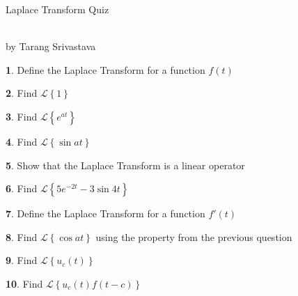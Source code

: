 \documentclass[11pt]{article}
\author{Tarang Srivastava}
\newcommand{\laplace}[1]{$ \mathcal{L}  \left\{ #1 \right\}$}
\newcommand{\heaviside}[1]{u_{#1} (t)}
\newcommand{\makechaptertitle}{
\begin{center}
	\begin{large}
		Laplace Transform Quiz
	\end{large}
	\begin{small}
		\\by Tarang Srivastava
	\end{small}
\end{center}
}
\theoremstyle{definition}
\newtheorem{q}{}
\begin{document}
	\begin{multicols*}{2}
		\makechaptertitle
		
		\begin{q}
			Define the Laplace Transform for a function $ f(t) $
		\end{q}
		\begin{q}
			Find \laplace{1}
		\end{q}
		\begin{q}
			Find \laplace{e^{at}}
		\end{q}
		\begin{q}
			Find \laplace{\sin at}
		\end{q}
		\begin{q}
			Show that the Laplace Transform is a linear operator
		\end{q}
		\begin{q}
			Find \laplace{5e^{-2t} - 3 \sin 4t}
		\end{q}
		\begin{q}
			Define the Laplace Transform for a function $ f'(t) $
		\end{q}
		\begin{q}
			Find \laplace{\cos at} using the property from the previous question 
		\end{q}
		\begin{q}
			Find \laplace{\heaviside{c}}
		\end{q}
		\begin{q}
			Find \laplace{\heaviside{c}f(t-c)}
		\end{q}
	\end{multicols*}
\end{document}
